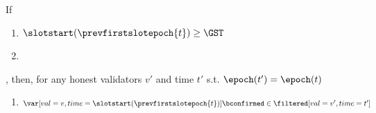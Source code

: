 \documentclass{article}
\begin{document}

\begin{lemma}\label{lem:prev-confirmed-not-filtered-out-start-of-epoch}
    If
    \begin{enumerate}
        \item $\slotstart(\prevfirstslotepoch{t})\geq \GST$
        \item {}
    \end{enumerate},
    then, for any honest validators $v'$ and time $t'$ s.t. $\epoch(t') = \epoch(t)$
    \begin{enumerate}
        \item $\var[val=v,time=\slotstart(\prevfirstslotepoch{t})]{\bconfirmed} \in \filtered[val=v',time=t']$
    \end{enumerate}
\end{lemma}
\end{document}
